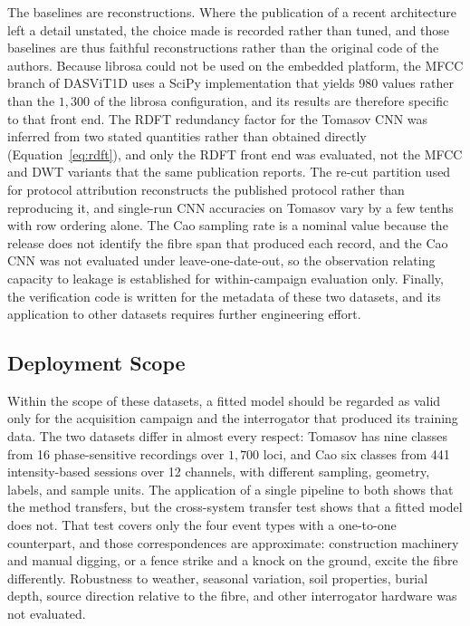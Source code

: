 The baselines are reconstructions. Where the publication of a recent architecture left a detail unstated, the choice made is recorded rather than tuned, and those baselines are thus faithful reconstructions rather than the original code of the authors. Because librosa could not be used on the embedded platform, the MFCC branch of DASViT1D uses a SciPy implementation that yields 980 values rather than the $1{,}300$ of the librosa configuration, and its results are therefore specific to that front end. The RDFT redundancy factor for the Tomasov CNN was inferred from two stated quantities rather than obtained directly (Equation~\eqref{eq:rdft}), and only the RDFT front end was evaluated, not the MFCC and DWT variants that the same publication reports. The re-cut partition used for protocol attribution reconstructs the published protocol rather than reproducing it, and single-run CNN accuracies on Tomasov vary by a few tenths with row ordering alone. The Cao sampling rate is a nominal value because the release does not identify the fibre span that produced each record, and the Cao CNN was not evaluated under leave-one-date-out, so the observation relating capacity to leakage is established for within-campaign evaluation only. Finally, the verification code is written for the metadata of these two datasets, and its application to other datasets requires further engineering effort.

\subsection{Deployment Scope}
\label{sec:chap5LimScope}
Within the scope of these datasets, a fitted model should be regarded as valid only for the acquisition campaign and the interrogator that produced its training data. The two datasets differ in almost every respect: Tomasov has nine classes from 16 phase-sensitive recordings over $1{,}700$ loci, and Cao six classes from 441 intensity-based sessions over 12 channels, with different sampling, geometry, labels, and sample units. The application of a single pipeline to both shows that the method transfers, but the cross-system transfer test shows that a fitted model does not. That test covers only the four event types with a one-to-one counterpart, and those correspondences are approximate: construction machinery and manual digging, or a fence strike and a knock on the ground, excite the fibre differently. Robustness to weather, seasonal variation, soil properties, burial depth, source direction relative to the fibre, and other interrogator hardware was not evaluated.

